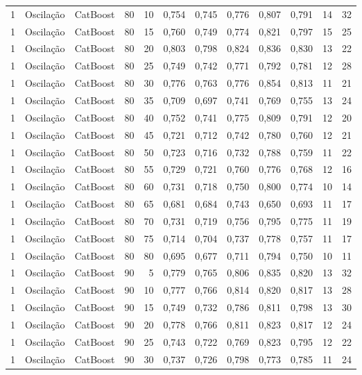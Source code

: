 \begin{longtable}{@{}rllrrrrrrrrr@{}}
1 & Oscilação & CatBoost & 80 & 10 & 0,754 & 0,745 & 0,776 & 0,807 & 0,791 & 14 & 32 \\
1 & Oscilação & CatBoost & 80 & 15 & 0,760 & 0,749 & 0,774 & 0,821 & 0,797 & 15 & 25 \\
1 & Oscilação & CatBoost & 80 & 20 & 0,803 & 0,798 & 0,824 & 0,836 & 0,830 & 13 & 22 \\
1 & Oscilação & CatBoost & 80 & 25 & 0,749 & 0,742 & 0,771 & 0,792 & 0,781 & 12 & 28 \\
1 & Oscilação & CatBoost & 80 & 30 & 0,776 & 0,763 & 0,776 & 0,854 & 0,813 & 11 & 21 \\
1 & Oscilação & CatBoost & 80 & 35 & 0,709 & 0,697 & 0,741 & 0,769 & 0,755 & 13 & 24 \\
1 & Oscilação & CatBoost & 80 & 40 & 0,752 & 0,741 & 0,775 & 0,809 & 0,791 & 12 & 20 \\
1 & Oscilação & CatBoost & 80 & 45 & 0,721 & 0,712 & 0,742 & 0,780 & 0,760 & 12 & 21 \\
1 & Oscilação & CatBoost & 80 & 50 & 0,723 & 0,716 & 0,732 & 0,788 & 0,759 & 11 & 22 \\
1 & Oscilação & CatBoost & 80 & 55 & 0,729 & 0,721 & 0,760 & 0,776 & 0,768 & 12 & 16 \\
1 & Oscilação & CatBoost & 80 & 60 & 0,731 & 0,718 & 0,750 & 0,800 & 0,774 & 10 & 14 \\
1 & Oscilação & CatBoost & 80 & 65 & 0,681 & 0,684 & 0,743 & 0,650 & 0,693 & 11 & 17 \\
1 & Oscilação & CatBoost & 80 & 70 & 0,731 & 0,719 & 0,756 & 0,795 & 0,775 & 11 & 19 \\
1 & Oscilação & CatBoost & 80 & 75 & 0,714 & 0,704 & 0,737 & 0,778 & 0,757 & 11 & 17 \\
1 & Oscilação & CatBoost & 80 & 80 & 0,695 & 0,677 & 0,711 & 0,794 & 0,750 & 10 & 11 \\
1 & Oscilação & CatBoost & 90 & 5 & 0,779 & 0,765 & 0,806 & 0,835 & 0,820 & 13 & 32 \\
1 & Oscilação & CatBoost & 90 & 10 & 0,777 & 0,766 & 0,814 & 0,820 & 0,817 & 13 & 28 \\
1 & Oscilação & CatBoost & 90 & 15 & 0,749 & 0,732 & 0,786 & 0,811 & 0,798 & 13 & 30 \\
1 & Oscilação & CatBoost & 90 & 20 & 0,778 & 0,766 & 0,811 & 0,823 & 0,817 & 12 & 24 \\
1 & Oscilação & CatBoost & 90 & 25 & 0,743 & 0,722 & 0,769 & 0,823 & 0,795 & 12 & 22 \\
1 & Oscilação & CatBoost & 90 & 30 & 0,737 & 0,726 & 0,798 & 0,773 & 0,785 & 11 & 24 \\

\end{longtable}
